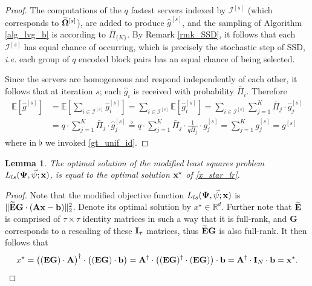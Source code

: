 \documentclass[journal,letterpaper,onecolumn,twoside,nofonttune]{IEEEtran}
\newcommand{\R}{\mathbb{R}}
\newcommand{\E}{\mathbb{E}}
\newcommand{\I}{\mathcal{I}}
\newcommand{\bb}{\bold{b}}
\newcommand{\xb}{\bold{x}}
\newcommand{\Ab}{\bold{A}}
\newcommand{\Eb}{\bold{E}}
\newcommand{\Ebwt}{\widetilde{\bold{E}}}
\newcommand{\Gb}{\bold{G}}
\newcommand{\Ib}{\bold{I}}
\newcommand{\gh}{\hat{g}}
\newcommand{\Omb}{\bold{\Omega}}
\newcommand{\Ombwt}{\widetilde{\Omb}}
\newcommand{\Pib}{\bar{\Pi}}
\newcommand{\PsiB}{\bold{\Psi}}
\newcommand{\psiv}{\vec{\psi}}
\newtheorem{Lemma}{Lemma}
\begin{document}
\begin{proof}
The computations of the $q$ fastest servers indexed by $\I^{[s]}$ (which corresponds to $\Ombwt^{[s]}$), are added to produce $\gh^{[s]}$, and the sampling of Algorithm \ref{alg_lvg_b} is according to $\Pib_{\{K\}}$. By Remark \ref{rmk_SSD}, it follows that each $\I^{[s]}$ has equal chance of occurring, which is precisely the stochastic step of SSD, \textit{i.e.} each group of $q$ encoded block pairs has an equal chance of being selected.

Since the servers are homogeneous and respond independently of each other, it follows that at iteration $s$; each $\gh_i$ is received with probability $\Pib_i$. Therefore
\begin{align*}
  \E\left[\gh^{[s]}\right] &= \E\left[\sum_{i\in\I^{[s]}}\gh_i^{[s]}\right] = \sum_{i\in\I^{[s]}}\E\left[\gh_i^{[s]}\right] = \sum_{i\in\I^{[s]}}\sum_{j=1}^K\Pib_j\cdot\gh_j^{[s]}\\
  &= q\cdot\sum_{j=1}^K\Pib_j\cdot\gh_j^{[s]} \overset{\flat}{=} q\cdot\sum_{j=1}^K\Pib_j\cdot\frac{1}{q\Pib_j}\cdot g_j^{[s]} = \sum_{j=1}^Kg_j^{[s]} = g^{[s]}
\end{align*}
where in $\flat$ we invoked \eqref{gt_unif_id}.
\end{proof}

\begin{Lemma}
\label{eq_opt_sols}  %
The optimal solution of the modified least squares problem $L_{ls}(\PsiB,\psiv;\xb)$, is equal to the optimal solution $\xb^\star$ of \eqref{x_star_lr}.
\end{Lemma}

\begin{proof}
Note that the modified objective function $L_{ls}(\PsiB,\psiv;\xb)$ is $\|\Ebwt\Gb\cdot(\Ab\xb-\bb)\|_2^2$. Denote its optimal solution by $x^{\star}\in\R^d$. Further note that $\Ebwt$ is comprised of $\tau\times\tau$ identity matrices in such a way that it is full-rank, and $\Gb$ corresponds to a rescaling of these $\Ib_\tau$ matrices, thus $\Ebwt\Gb$ is also full-rank. It then follows that
$$ x^{\star} = \big((\Eb\Gb)\cdot\Ab\big)^\dagger\cdot\big((\Eb\Gb)\cdot\bb\big) = \Ab^\dagger\cdot\big((\Eb\Gb)^\dagger\cdot(\Eb\Gb)\big)\cdot\bb = \Ab^\dagger\cdot\Ib_N\cdot\bb = \xb^\star. $$
\end{proof}
\end{document}
